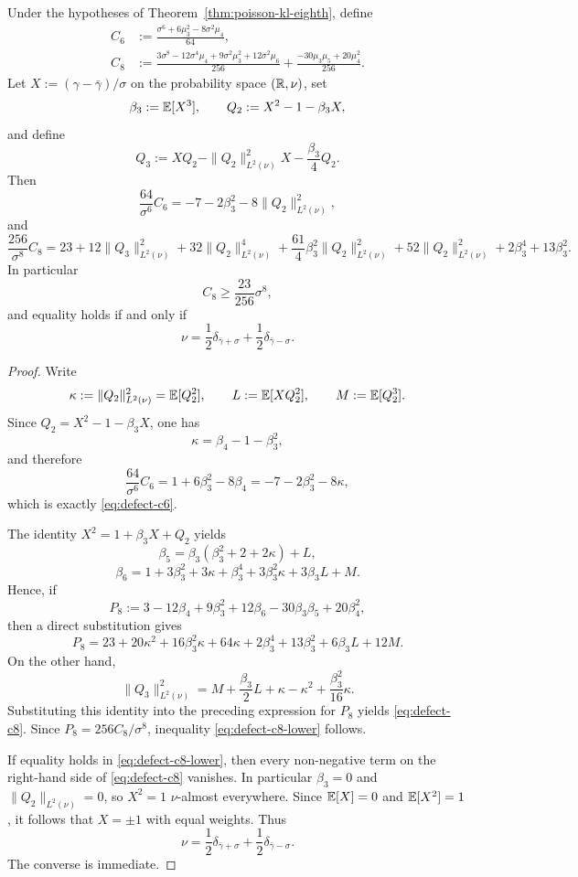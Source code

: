 \begin{theorem}%
\label{thm:poisson-defect-ladder}
Under the hypotheses of Theorem~\ref{thm:poisson-kl-eighth}, define
\begin{align*}
C_6&:=\frac{\sigma^6+6\mu_3^2-8\sigma^2\mu_4}{64}, \\
C_8&:=
\frac{3\sigma^8-12\sigma^4\mu_4+9\sigma^2\mu_3^2+12\sigma^2\mu_6}{256}
+\frac{-30\mu_3\mu_5+20\mu_4^2}{256}.
\end{align*}
Let $X:=(\gamma-\bar\gamma)/\sigma$ on the probability space
$(\mathbb{R},\nu)$, set
\[
\beta_3:=\mathbb{E}[X^3],
\qquad
Q_2:=X^2-1-\beta_3X,
\]
and define
\[
Q_3:=XQ_2-\|Q_2\|_{L^2(\nu)}^2X-\frac{\beta_3}{4}Q_2.
\]
Then
\begin{equation}\label{eq:defect-c6}
\frac{64}{\sigma^6}C_6
=-7-2\beta_3^2-8\|Q_2\|_{L^2(\nu)}^2,
\end{equation}
and
\begin{equation}\label{eq:defect-c8}
\frac{256}{\sigma^8}C_8
=23
+12\|Q_3\|_{L^2(\nu)}^2
+32\|Q_2\|_{L^2(\nu)}^4
+\frac{61}{4}\beta_3^2\|Q_2\|_{L^2(\nu)}^2
+52\|Q_2\|_{L^2(\nu)}^2
+2\beta_3^4
+13\beta_3^2.
\end{equation}
In particular
\begin{equation}\label{eq:defect-c8-lower}
C_8\ge \frac{23}{256}\sigma^8,
\end{equation}
and equality holds if and only if
\[
\nu=\frac12\delta_{\bar\gamma+\sigma}
+\frac12\delta_{\bar\gamma-\sigma}.
\]
\end{theorem}

\begin{proof}
Write
\[
\kappa:=\|Q_2\|_{L^2(\nu)}^2=\mathbb{E}[Q_2^2],
\qquad
L:=\mathbb{E}[XQ_2^2],
\qquad
M:=\mathbb{E}[Q_2^3].
\]
Since $Q_2=X^2-1-\beta_3X$, one has
\[
\kappa=\beta_4-1-\beta_3^2,
\]
and therefore
\[
\frac{64}{\sigma^6}C_6
=1+6\beta_3^2-8\beta_4
=-7-2\beta_3^2-8\kappa,
\]
which is exactly \eqref{eq:defect-c6}.

The identity $X^2=1+\beta_3X+Q_2$ yields
\[
\beta_5=\beta_3(\beta_3^2+2+2\kappa)+L,
\]
\[
\beta_6=1+3\beta_3^2+3\kappa+\beta_3^4+3\beta_3^2\kappa+3\beta_3L+M.
\]
Hence, if
\[
P_8:=3-12\beta_4+9\beta_3^2+12\beta_6-30\beta_3\beta_5+20\beta_4^2,
\]
then a direct substitution gives
\[
P_8
=23+20\kappa^2+16\beta_3^2\kappa+64\kappa+2\beta_3^4+13\beta_3^2+6\beta_3L+12M.
\]
On the other hand,
\[
\|Q_3\|_{L^2(\nu)}^2
=M+\frac{\beta_3}{2}L+\kappa-\kappa^2+\frac{\beta_3^2}{16}\kappa.
\]
Substituting this identity into the preceding expression for $P_8$
yields \eqref{eq:defect-c8}.  Since
$P_8=256C_8/\sigma^8$, inequality \eqref{eq:defect-c8-lower} follows.

If equality holds in \eqref{eq:defect-c8-lower}, then every non-negative
term on the right-hand side of \eqref{eq:defect-c8} vanishes.  In
particular $\beta_3=0$ and $\|Q_2\|_{L^2(\nu)}=0$, so $X^2=1$
$\nu$-almost everywhere.  Since $\mathbb{E}[X]=0$ and $\mathbb{E}[X^2]=1$, it follows
that $X=\pm 1$ with equal weights.  Thus
\[
\nu=\frac12\delta_{\bar\gamma+\sigma}
+\frac12\delta_{\bar\gamma-\sigma}.
\]
The converse is immediate.
\end{proof}

